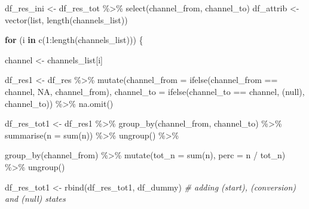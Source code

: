 \documentclass[
]{book}
\newenvironment{Shaded}{\begin{snugshade}}{\end{snugshade}}
\newcommand{\AttributeTok}[1]{\textcolor[rgb]{0.77,0.63,0.00}{#1}}
\newcommand{\CommentTok}[1]{\textcolor[rgb]{0.56,0.35,0.01}{\textit{#1}}}
\newcommand{\ConstantTok}[1]{\textcolor[rgb]{0.00,0.00,0.00}{#1}}
\newcommand{\ControlFlowTok}[1]{\textcolor[rgb]{0.13,0.29,0.53}{\textbf{#1}}}
\newcommand{\DecValTok}[1]{\textcolor[rgb]{0.00,0.00,0.81}{#1}}
\newcommand{\FunctionTok}[1]{\textcolor[rgb]{0.00,0.00,0.00}{#1}}
\newcommand{\NormalTok}[1]{#1}
\newcommand{\OtherTok}[1]{\textcolor[rgb]{0.56,0.35,0.01}{#1}}
\newcommand{\SpecialCharTok}[1]{\textcolor[rgb]{0.00,0.00,0.00}{#1}}
\newcommand{\StringTok}[1]{\textcolor[rgb]{0.31,0.60,0.02}{#1}}
\begin{document}
\begin{Shaded}
\begin{Highlighting}[]
\NormalTok{df\_res\_ini }\OtherTok{\textless{}{-}}\NormalTok{ df\_res\_tot }\SpecialCharTok{\%\textgreater{}\%} \FunctionTok{select}\NormalTok{(channel\_from, channel\_to)}
\NormalTok{df\_attrib }\OtherTok{\textless{}{-}} \FunctionTok{vector}\NormalTok{(}\StringTok{\textquotesingle{}list\textquotesingle{}}\NormalTok{, }\FunctionTok{length}\NormalTok{(channels\_list))}
 
\ControlFlowTok{for}\NormalTok{ (i }\ControlFlowTok{in} \FunctionTok{c}\NormalTok{(}\DecValTok{1}\SpecialCharTok{:}\FunctionTok{length}\NormalTok{(channels\_list))) \{}
         
\NormalTok{        channel }\OtherTok{\textless{}{-}}\NormalTok{ channels\_list[i]}
         
\NormalTok{        df\_res1 }\OtherTok{\textless{}{-}}\NormalTok{ df\_res }\SpecialCharTok{\%\textgreater{}\%}
                \FunctionTok{mutate}\NormalTok{(}\AttributeTok{channel\_from =} \FunctionTok{ifelse}\NormalTok{(channel\_from }\SpecialCharTok{==}\NormalTok{ channel, }\ConstantTok{NA}\NormalTok{, channel\_from),}
                       \AttributeTok{channel\_to =} \FunctionTok{ifelse}\NormalTok{(channel\_to }\SpecialCharTok{==}\NormalTok{ channel, }\StringTok{\textquotesingle{}(null)\textquotesingle{}}\NormalTok{, channel\_to)) }\SpecialCharTok{\%\textgreater{}\%}
                \FunctionTok{na.omit}\NormalTok{()}
         
\NormalTok{        df\_res\_tot1 }\OtherTok{\textless{}{-}}\NormalTok{ df\_res1 }\SpecialCharTok{\%\textgreater{}\%}
                \FunctionTok{group\_by}\NormalTok{(channel\_from, channel\_to) }\SpecialCharTok{\%\textgreater{}\%}
                \FunctionTok{summarise}\NormalTok{(}\AttributeTok{n =} \FunctionTok{sum}\NormalTok{(n)) }\SpecialCharTok{\%\textgreater{}\%}
                \FunctionTok{ungroup}\NormalTok{() }\SpecialCharTok{\%\textgreater{}\%}
                 
                \FunctionTok{group\_by}\NormalTok{(channel\_from) }\SpecialCharTok{\%\textgreater{}\%}
                \FunctionTok{mutate}\NormalTok{(}\AttributeTok{tot\_n =} \FunctionTok{sum}\NormalTok{(n),}
                       \AttributeTok{perc =}\NormalTok{ n }\SpecialCharTok{/}\NormalTok{ tot\_n) }\SpecialCharTok{\%\textgreater{}\%}
                \FunctionTok{ungroup}\NormalTok{()}
         
\NormalTok{        df\_res\_tot1 }\OtherTok{\textless{}{-}} \FunctionTok{rbind}\NormalTok{(df\_res\_tot1, df\_dummy) }\CommentTok{\# adding (start), (conversion) and (null) states}
         

\end{Highlighting}
\end{Shaded}
\end{document}
